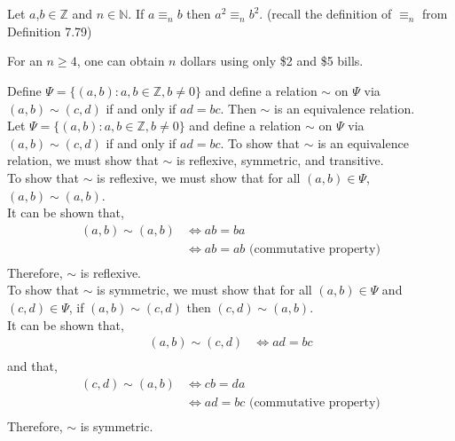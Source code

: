 \documentclass[12pt]{article}
\newenvironment{theorem}[2][Theorem]{\begin{trivlist}
\item[\hskip \labelsep {\bfseries #1}\hskip \labelsep {\bfseries #2.}]}{\end{trivlist}}
\begin{document}
\section{}
\begin{theorem}4
	Let $a$,$b \in \mathbb{Z}$ and $n \in \mathbb{N}$. If $a \equiv_n b$ then $a^2 \equiv_n b^2$. (recall the definition of $\equiv_n$ from Definition 7.79)
\end{theorem}
\begin{theorem}5
	For an $n \geq 4$, one can obtain $n$ dollars using only \$2 and \$5 bills.
\end{theorem}
\begin{theorem}{6 Complete but gross}
	Define $\Psi = \{(a,b): a,b \in \mathbb{Z}, b\neq 0\}$ and define a relation $\sim$ on $\Psi$ via $(a,b) \sim (c,d)$ if and only if
	$ad=bc$. Then $\sim$ is an equivalence relation.\\

	Let $\Psi = \{(a,b): a,b \in \mathbb{Z}, b\neq 0\}$ and define a relation $\sim$ on $\Psi$ via $(a,b) \sim (c,d)$ if and only if
	$ad=bc$. To show that $\sim$ is an equivalence relation, we must show that $\sim$ is reflexive, symmetric, and transitive.\\

	To show that $\sim$ is reflexive, we must show that for all $(a,b) \in \Psi$, $(a,b) \sim (a,b)$.\\
	It can be shown that, 
	\begin{align*}
		(a,b) \sim (a,b) &\Leftrightarrow ab=ba\\
				 &\Leftrightarrow ab=ab \text{ (commutative property)}\\
	\end{align*}
	Therefore, $\sim$ is reflexive.\\

	To show that $\sim$ is symmetric, we must show that for all $(a,b) \in \Psi$ and $(c,d) \in \Psi$, if $(a,b) \sim (c,d)$ then $(c,d) \sim (a,b)$.\\
	It can be shown that,
	\begin{align*}
		(a,b) \sim (c,d) &\Leftrightarrow ad=bc\\
	\end{align*}
	and that,
	\begin{align*}
		(c,d) \sim (a,b) &\Leftrightarrow cb=da\\
				 &\Leftrightarrow ad=bc \text{ (commutative property)}\\
	\end{align*}
	Therefore, $\sim$ is symmetric.\\


\end{theorem}
\end{document}
